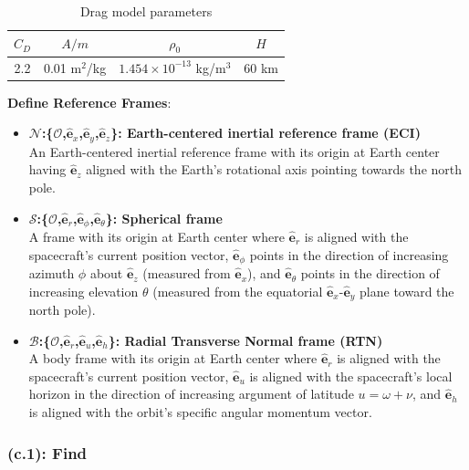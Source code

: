 \documentclass[titlepage]{article}
\begin{document}
\begin{table}[H]
	\centering
	\caption{Drag model parameters}
	\label{tab:drag_parameters}
	\begin{tabular}{|c|c|c|c|}
		\hline
		$C_D$ & $A/m$ & $\rho_0$ & $H$ \\
		\hline
		2.2 & 0.01 m$^2$/kg & $1.454\times10^{-13}$ kg/m$^3$ & 60 km \\
		\hline
	\end{tabular}
\end{table}

\textbf{Define Reference Frames}:
\begin{itemize}
	\item \textbf{$\mathcal{N}$:\{$\mathcal{O}$,$\hat{\boldsymbol{e}}_x$,$\hat{\boldsymbol{e}}_y$,$\hat{\boldsymbol{e}}_z$\}: Earth-centered inertial reference frame (ECI)\\}An Earth-centered inertial reference frame with its origin at Earth center having $\hat{\boldsymbol{e}}_z$ aligned with the Earth's rotational axis pointing towards the north pole.
	\item \textbf{$\mathcal{S}$:\{$\mathcal{O}$,$\hat{\boldsymbol{e}}_r$,$\hat{\boldsymbol{e}}_\phi$,$\hat{\boldsymbol{e}}_\theta$\}: Spherical frame\\}A frame with its origin at Earth center where $\hat{\boldsymbol{e}}_r$ is aligned with the spacecraft's current position vector, $\hat{\boldsymbol{e}}_\phi$ points in the direction of increasing azimuth $\phi$ about $\hat{\boldsymbol{e}}_z$ (measured from $\hat{\boldsymbol{e}}_x$), and $\hat{\boldsymbol{e}}_\theta$ points in the direction of increasing elevation $\theta$ (measured from the equatorial $\hat{\boldsymbol{e}}_x$-$\hat{\boldsymbol{e}}_y$ plane toward the north pole).
	\item \textbf{$\mathcal{B}$:\{$\mathcal{O}$,$\hat{\boldsymbol{e}}_r$,$\hat{\boldsymbol{e}}_u$,$\hat{\boldsymbol{e}}_h$\}: Radial Transverse Normal frame (RTN)\\}A body frame with its origin at Earth center where $\hat{\boldsymbol{e}}_r$ is aligned with the spacecraft's current position vector, $\hat{\boldsymbol{e}}_u$ is aligned with the spacecraft's local horizon in the direction of increasing argument of latitude $u=\omega+\nu$, and $\hat{\boldsymbol{e}}_h$ is aligned with the orbit's specific angular momentum vector.
\end{itemize}

\subsubsection*{(c.1): Find}
\end{document}
